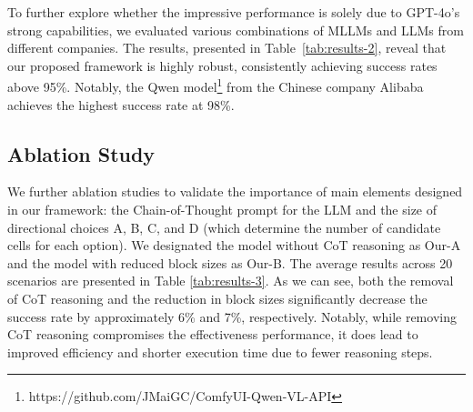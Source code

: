 To further explore whether the impressive performance is solely due to GPT-4o's strong capabilities, we evaluated various combinations of MLLMs and LLMs from different companies. The results, presented in Table~\ref{tab:results-2}, reveal that our proposed framework is highly robust, consistently achieving success rates above 95\%. Notably, the Qwen model\footnote[3]{https://github.com/JMaiGC/ComfyUI-Qwen-VL-API} from the Chinese company Alibaba achieves the highest success rate at 98\%.

\vspace{-5mm}

\begin{table}[!ht]
    \centering
    \caption{Results of the comparisons over various large models.}
    \label{tab:results-2}
\end{table}

\vspace{-5mm}

\subsection{Ablation Study}

We further ablation studies to validate the importance of main elements designed in our framework: the Chain-of-Thought prompt for the LLM and the size of directional choices A, B, C, and D (which determine the number of candidate cells for each option). We designated the model without CoT reasoning as Our-A and the model with reduced block sizes as Our-B. The average results across 20 scenarios are presented in Table \ref{tab:results-3}. As we can see, both the removal of CoT reasoning and the reduction in block sizes significantly decrease the success rate by approximately 6\% and 7\%, respectively. Notably, while removing CoT reasoning compromises the effectiveness performance, it does lead to improved efficiency and shorter execution time due to fewer reasoning steps.

